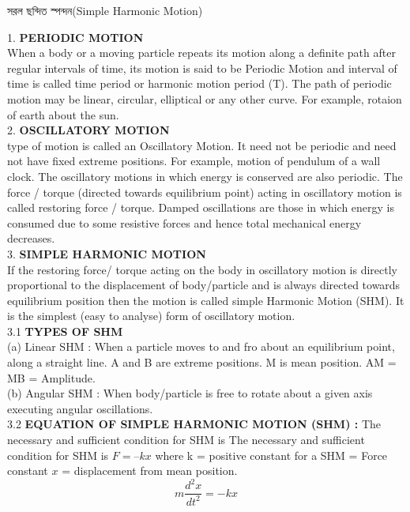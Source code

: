 \documentclass[addpoints]{exam}
\begin{document}
\begin{LARGE}
\begin{center}
সরল ছন্দিত স্পন্দন(Simple Harmonic Motion)
\end{center}
\end{LARGE}

1. \textbf{ PERIODIC MOTION}\\
When a body or a moving particle repeats its motion along a definite path after regular intervals of time, its
motion is said to be Periodic Motion and interval of time is called time period or harmonic motion period
(T). The path of periodic motion may be linear, circular, elliptical or any other curve. For example, rotaion of
earth about the sun.\\

2. \textbf{OSCILLATORY MOTION}\\
 type of motion is called an Oscillatory Motion. It need not be periodic and need not have fixed
extreme positions. For example, motion of pendulum of a wall clock.
The oscillatory motions in which energy is conserved are also periodic.
The force / torque (directed towards equilibrium point) acting in oscillatory motion is called restoring force /
torque.
Damped oscillations are those in which energy is consumed due to some resistive forces and hence total
mechanical energy decreases.\\

3. \textbf{SIMPLE HARMONIC MOTION}\\
If the restoring force/ torque acting on the body in oscillatory motion is directly proportional to the displacement of body/particle and is always directed towards equilibrium position then the motion is called simple
Harmonic Motion (SHM). It is the simplest (easy to analyse) form of oscillatory motion.\\
3.1 \textbf{TYPES OF SHM}\\
(a) Linear SHM : When a particle moves to and fro about an equilibrium point, along a straight line. A and B are
extreme positions. M is mean position. AM = MB = Amplitude.\\
(b) Angular SHM : When body/particle is free to rotate about a given axis executing angular oscillations.\\
3.2 \textbf{EQUATION OF SIMPLE HARMONIC MOTION (SHM) :}
The necessary and sufficient condition for SHM is
The necessary and sufficient condition for SHM is
$ F = – kx $
where k = positive constant for a SHM = Force constant
$ x $ = displacement from mean position.
\[m\dfrac{d^{2}x}{dt^{2}} = -kx\]
\end{document}

